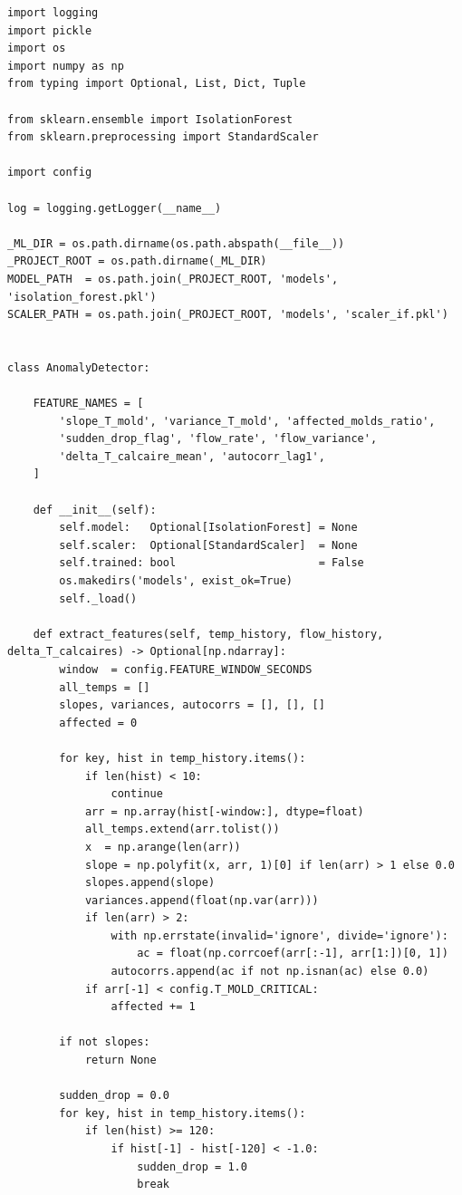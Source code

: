 \begin{lstlisting}
import logging
import pickle
import os
import numpy as np
from typing import Optional, List, Dict, Tuple

from sklearn.ensemble import IsolationForest
from sklearn.preprocessing import StandardScaler

import config

log = logging.getLogger(__name__)

_ML_DIR = os.path.dirname(os.path.abspath(__file__))
_PROJECT_ROOT = os.path.dirname(_ML_DIR)
MODEL_PATH  = os.path.join(_PROJECT_ROOT, 'models', 'isolation_forest.pkl')
SCALER_PATH = os.path.join(_PROJECT_ROOT, 'models', 'scaler_if.pkl')


class AnomalyDetector:

    FEATURE_NAMES = [
        'slope_T_mold', 'variance_T_mold', 'affected_molds_ratio',
        'sudden_drop_flag', 'flow_rate', 'flow_variance',
        'delta_T_calcaire_mean', 'autocorr_lag1',
    ]

    def __init__(self):
        self.model:   Optional[IsolationForest] = None
        self.scaler:  Optional[StandardScaler]  = None
        self.trained: bool                      = False
        os.makedirs('models', exist_ok=True)
        self._load()

    def extract_features(self, temp_history, flow_history, delta_T_calcaires) -> Optional[np.ndarray]:
        window  = config.FEATURE_WINDOW_SECONDS
        all_temps = []
        slopes, variances, autocorrs = [], [], []
        affected = 0

        for key, hist in temp_history.items():
            if len(hist) < 10:
                continue
            arr = np.array(hist[-window:], dtype=float)
            all_temps.extend(arr.tolist())
            x  = np.arange(len(arr))
            slope = np.polyfit(x, arr, 1)[0] if len(arr) > 1 else 0.0
            slopes.append(slope)
            variances.append(float(np.var(arr)))
            if len(arr) > 2:
                with np.errstate(invalid='ignore', divide='ignore'):
                    ac = float(np.corrcoef(arr[:-1], arr[1:])[0, 1])
                autocorrs.append(ac if not np.isnan(ac) else 0.0)
            if arr[-1] < config.T_MOLD_CRITICAL:
                affected += 1

        if not slopes:
            return None

        sudden_drop = 0.0
        for key, hist in temp_history.items():
            if len(hist) >= 120:
                if hist[-1] - hist[-120] < -1.0:
                    sudden_drop = 1.0
                    break


\end{lstlisting}
